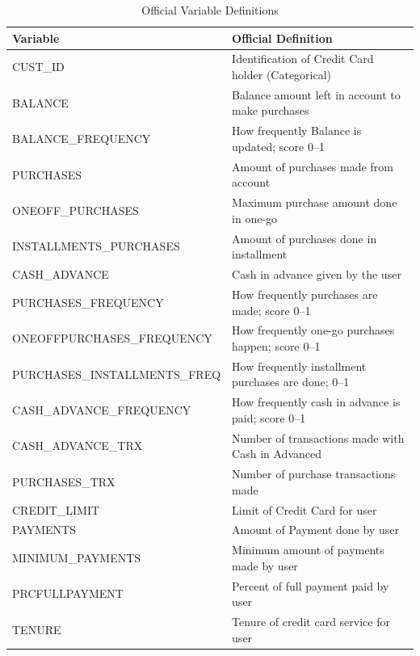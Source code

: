 \documentclass[12pt, letterpaper]{article}
\begin{document}
\begin{table}[H]
  \centering
  \caption{Official Variable Definitions}
  \renewcommand{\arraystretch}{1.3}
  \begin{tabular}{>{\ttfamily\small}p{5.5cm} p{8cm}}
    \toprule
    \normalfont\textbf{Variable} & \textbf{Official Definition} \\
    \midrule
    CUST\_ID                       & Identification of Credit Card holder (Categorical) \\
    BALANCE                        & Balance amount left in account to make purchases \\
    BALANCE\_FREQUENCY             & How frequently Balance is updated; score 0--1 \\
    PURCHASES                      & Amount of purchases made from account \\
    ONEOFF\_PURCHASES              & Maximum purchase amount done in one-go \\
    INSTALLMENTS\_PURCHASES        & Amount of purchases done in installment \\
    CASH\_ADVANCE                  & Cash in advance given by the user \\
    PURCHASES\_FREQUENCY           & How frequently purchases are made; score 0--1 \\
    ONEOFFPURCHASES\_FREQUENCY     & How frequently one-go purchases happen; score 0--1 \\
    PURCHASES\_INSTALLMENTS\_FREQ  & How frequently installment purchases are done; 0--1 \\
    CASH\_ADVANCE\_FREQUENCY       & How frequently cash in advance is paid; score 0--1 \\
    CASH\_ADVANCE\_TRX             & Number of transactions made with Cash in Advanced \\
    PURCHASES\_TRX                 & Number of purchase transactions made \\
    CREDIT\_LIMIT                  & Limit of Credit Card for user \\
    PAYMENTS                       & Amount of Payment done by user \\
    MINIMUM\_PAYMENTS              & Minimum amount of payments made by user \\
    PRCFULLPAYMENT                 & Percent of full payment paid by user \\
    TENURE                         & Tenure of credit card service for user \\
    \bottomrule
  \end{tabular}
\end{table}
\end{document}
